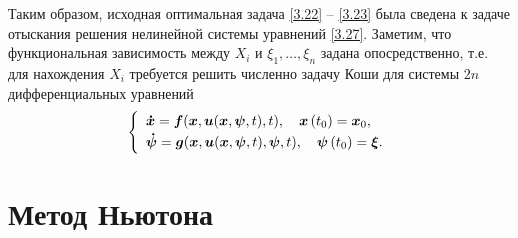 \documentclass[a4paper,12pt, openany]{book}
\theoremstyle{plain} %
\theoremstyle{definition} %
\theoremstyle{remark} %
\numberwithin{equation}{chapter}
\begin{document}
{Таким образом, исходная оптимальная задача \eqref{3.22} -- \eqref{3.23} была сведена к задаче отыскания решения нелинейной системы уравнений \eqref{3.27}. Заметим, что функциональная зависимость между $X_i$ и $\xi_1,\ldots,\xi_n$ задана опосредственно, т.е. для нахождения $X_i$ требуется решить численно задачу Коши для системы $2n$ дифференциальных уравнений 
\begin{equation}\label{3.28}
\left\{ {\begin{array}{*{20}l}
   {\bm {\dot x} = \bm f(\bm x,\bm u(\bm x, \bm \psi, t),t), \quad \bm x\left( t_0 \right) = \bm x_0 ,} \hfill  \\ [2pt]
   {\bm {\dot \psi}  =  \bm g(\bm x, \bm u(\bm x, \bm \psi, t),\bm \psi, t), \quad \bm \psi \left( t_0 \right) = \bm \xi.} \hfill  \\
 \end{array} } \right.
\end{equation}


\section{Метод Ньютона}

}
\end{document}
